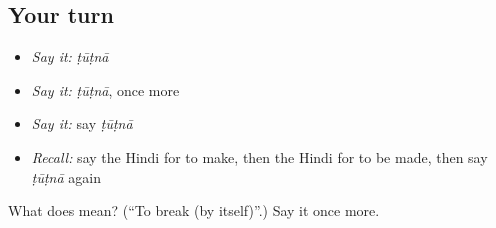 \subsection*{Your turn}
\begin{itemize}
\raggedright
  \item \emph{Say it:} \emph{ṭūṭnā}
  \item \emph{Say it:} \emph{ṭūṭnā}, once more
  \item \emph{Say it:} say \emph{ṭūṭnā}
  \item \emph{Recall:} say the Hindi for to make, then the Hindi for to be made, then say \emph{ṭūṭnā} again
\end{itemize}

\begin{tcolorbox}[breakable,colback=teal!4,colframe=teal!35!black,title={Before you move on}]
What does  mean? (\textquotedblleft{}To break (by itself)\textquotedblright{}.) Say it once more.
\end{tcolorbox}
